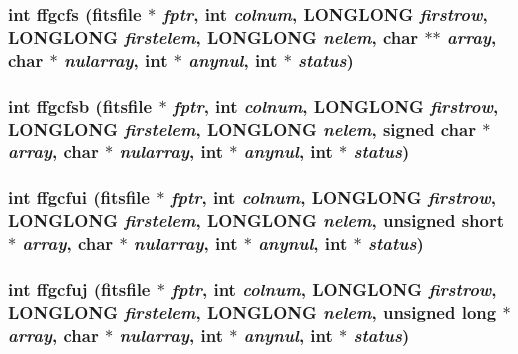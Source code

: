 \subsubsection{\setlength{\rightskip}{0pt plus 5cm}int ffgcfs (\bf{fitsfile} $\ast$ {\em fptr}, int {\em colnum}, \bf{LONGLONG} {\em firstrow}, \bf{LONGLONG} {\em firstelem}, \bf{LONGLONG} {\em nelem}, char $\ast$$\ast$ {\em array}, char $\ast$ {\em nularray}, int $\ast$ {\em anynul}, int $\ast$ {\em status})}\label{src_2fitsio_8h_a57b7d22e379bf81757b352c0701f411}


\subsubsection{\setlength{\rightskip}{0pt plus 5cm}int ffgcfsb (\bf{fitsfile} $\ast$ {\em fptr}, int {\em colnum}, \bf{LONGLONG} {\em firstrow}, \bf{LONGLONG} {\em firstelem}, \bf{LONGLONG} {\em nelem}, signed char $\ast$ {\em array}, char $\ast$ {\em nularray}, int $\ast$ {\em anynul}, int $\ast$ {\em status})}\label{src_2fitsio_8h_4bcaebbb8ecb66306b607027c9b54582}


\subsubsection{\setlength{\rightskip}{0pt plus 5cm}int ffgcfui (\bf{fitsfile} $\ast$ {\em fptr}, int {\em colnum}, \bf{LONGLONG} {\em firstrow}, \bf{LONGLONG} {\em firstelem}, \bf{LONGLONG} {\em nelem}, unsigned short $\ast$ {\em array}, char $\ast$ {\em nularray}, int $\ast$ {\em anynul}, int $\ast$ {\em status})}\label{src_2fitsio_8h_c036eb4df2031062a6a0e955b3b595ad}


\subsubsection{\setlength{\rightskip}{0pt plus 5cm}int ffgcfuj (\bf{fitsfile} $\ast$ {\em fptr}, int {\em colnum}, \bf{LONGLONG} {\em firstrow}, \bf{LONGLONG} {\em firstelem}, \bf{LONGLONG} {\em nelem}, unsigned long $\ast$ {\em array}, char $\ast$ {\em nularray}, int $\ast$ {\em anynul}, int $\ast$ {\em status})}\label{src_2fitsio_8h_df130acad140dbcc2ea1c3c38d9e06c8}


